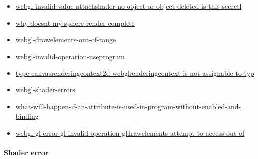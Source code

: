 \documentclass[]{article}
\begin{document}
\begin{itemize}
\item
  \href{http://stackoverflow.com/questions/14641618/webgl-invalid-value-attachshader-no-object-or-object-deleted-is-this-secretl}{webgl-invalid-value-attachshader-no-object-or-object-deleted-is-this-secretl}
\item
  \href{http://stackoverflow.com/questions/34617490/why-doesnt-my-sphere-render-complete}{why-doesnt-my-sphere-render-complete}
\item
  \href{http://stackoverflow.com/questions/15751791/webgl-drawelements-out-of-range/15753839\#15753839}{webgl-drawelements-out-of-range}
\item
  \href{http://stackoverflow.com/questions/11998781/webgl-invalid-operation-useprogram/11998987\#11998987}{webgl-invalid-operation-useprogram}
\item
  \href{http://stackoverflow.com/questions/32115328/type-canvasrenderingcontext2d-webglrenderingcontext-is-not-assignable-to-typ/32116589\#32116589}{type-canvasrenderingcontext2d-webglrenderingcontext-is-not-assignable-to-typ}
\item
  \href{http://stackoverflow.com/questions/11216912/webgl-shader-errors/11217704\#11217704}{webgl-shader-errors}
\item
  \href{http://stackoverflow.com/questions/21128464/what-will-happen-if-an-attribute-is-used-in-program-without-enabled-and-binding}{what-will-happen-if-an-attribute-is-used-in-program-without-enabled-and-binding}
\item
  \href{http://stackoverflow.com/questions/21200386/webgl-gl-error-gl-invalid-operation-gldrawelements-attempt-to-access-out-of/21212640\#21212640}{webgl-gl-error-gl-invalid-operation-gldrawelements-attempt-to-access-out-of}
\end{itemize}

\paragraph{Shader error}\label{shader-error}
\end{document}
